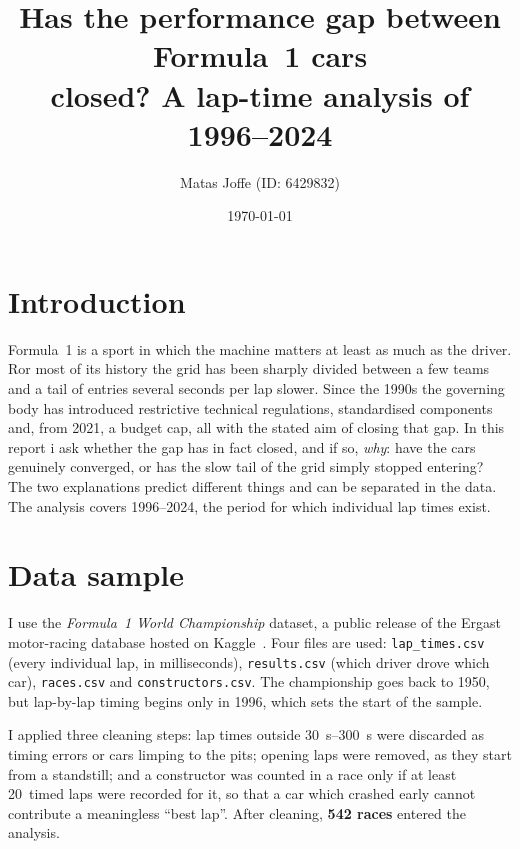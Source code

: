 \documentclass[11pt,a4paper]{article}
\title{\vspace{-1.5cm}\bfseries Has the performance gap between Formula~1 cars\\
       closed? A lap-time analysis of 1996--2024}
\author{Matas Joffe (ID: 6429832)}
\date{\today}
\begin{document}
\maketitle
\vspace{-0.9cm}

\section{Introduction}
Formula~1 is a sport in which the machine matters at least as much as the
driver. Ror most of its history the grid has been sharply divided between a
few teams and a tail of entries several seconds per lap slower. Since the
1990s the governing body has introduced restrictive technical regulations,
standardised components and, from 2021, a budget cap, all with the stated aim of
closing that gap. In this report i ask whether the gap has in fact closed, and if
so, \emph{why}: have
the cars genuinely converged, or has the slow tail of the grid simply stopped
entering? The two explanations predict different things and can be separated in
the data. The analysis covers 1996--2024, the period for which individual lap
times exist.

\section{Data sample}
I use the \emph{Formula~1 World Championship} dataset, a public release of the
Ergast motor-racing database hosted on Kaggle~\cite{dataset}. Four files are
used: \texttt{lap\_times.csv} (every individual lap, in milliseconds),
\texttt{results.csv} (which driver drove which car), \texttt{races.csv} and
\texttt{constructors.csv}. The championship goes back to 1950, but lap-by-lap
timing begins only in 1996, which sets the start of the sample.

I applied three cleaning steps: lap times outside
\SIrange{30}{300}{\second} were discarded as timing errors or cars limping to the
pits; opening laps were removed, as they start from a standstill; and a
constructor was counted in a race only if at least 20~timed laps were recorded
for it, so that a car which crashed early cannot contribute a meaningless
``best lap''. After cleaning, \textbf{542 races} entered the analysis.
\end{document}
